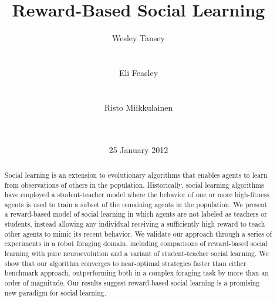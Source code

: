 \documentclass{acm_proc_article-sp}
\begin{document}
\title{Reward-Based Social Learning}

\author{
\alignauthor
Wesley Tansey\\
       \\
       \\
\alignauthor
Eli Feasley\\
       \\
       \\
\alignauthor
Risto Miikkulainen\\
       \\
       \\
}
\date{25 January 2012}

\maketitle
\begin{abstract}
Social learning is an extension to evolutionary algorithms that enables agents to learn from observations of others in the population. Historically, social learning algorithms have employed a student-teacher model where the behavior of one or more high-fitness agents is used to train a subset of the remaining agents in the population. We present a reward-based model of social learning in which agents are not labeled as teachers or students, instead allowing any individual receiving a sufficiently high reward to teach other agents to mimic its recent behavior. We validate our approach through a series of experiments in a robot foraging domain, including comparisons of reward-based social learning with pure neuroevolution and a variant of student-teacher social learning. We show that our algorithm converges to near-optimal strategies faster than either benchmark approach, outperforming both in a complex foraging task by more than an order of magnitude. Our results suggest reward-based social learning is a promising new paradigm for social learning.
\end{abstract}

\end{document}
